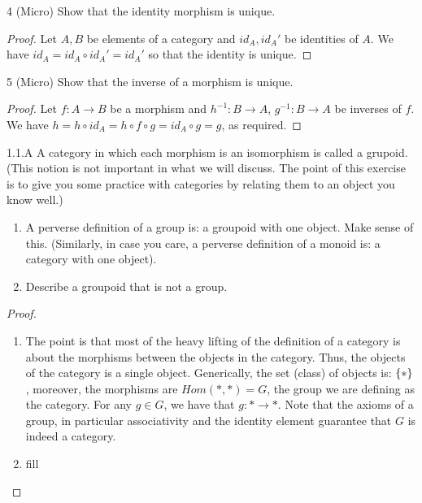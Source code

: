 \begin{exercise}{4 (Micro)}
Show that the identity morphism is unique.
\end{exercise}
\begin{proof}
Let $A, B$ be elements of a category and $id_A, id_A'$ be identities of $A$.
We have $id_A = id_A \circ id_A' = id_A'$ so that the identity is unique.
\end{proof} 

\begin{exercise}{5 (Micro)}
Show that the inverse of a morphism is unique.
\end{exercise}
\begin{proof}
Let $f: A \to B$ be a morphism and $h^{-1}: B \to A$, $g^{-1}: B \to A$ be inverses of $f$.
We have $h = h \circ id_A = h \circ f \circ g = id_A \circ g = g$, as required.
\end{proof} 

\begin{exercise}{1.1.A}
A category in which each morphism is an isomorphism is called a grupoid.
(This notion is not important in what we will discuss. 
The point of this exercise is to give you some practice with categories by relating them to an object you know well.)
\begin{enumerate}
    \item A perverse definition of a group is: a groupoid with one object.
    Make sense of this.
    (Similarly, in case you care, a perverse definition of a monoid is: a category with one object).
    \item Describe a groupoid that is not a group.
\end{enumerate}
\end{exercise}
\begin{proof}
\begin{enumerate}
    \item The point is that most of the heavy lifting of the definition of a category is about the morphisms between the objects in the category.
    Thus, the objects of the category is a single object.
    Generically, the set (class) of objects is: $\{\ast\}$, moreover, the morphisms are $Hom(\ast, \ast) = G$, the group we are defining as the category.
    For any $g \in G$, we have that $g: \ast \to \ast$.
    Note that the axioms of a group, in particular associativity and the identity element guarantee that $G$ is indeed a category.
    \item fill
\end{enumerate}
\end{proof} 

